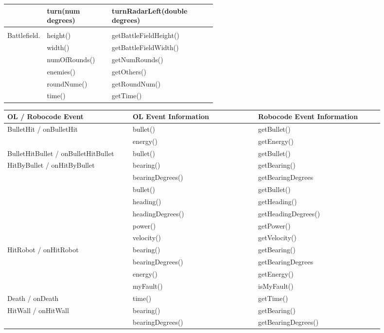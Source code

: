 \begin{center}
\begin{tabular}{ | l| l | p{0.5\linewidth} | }
     & turn(num degrees) & turnRadarLeft(double degrees) \\ \hline
     & &  \\ \hline
    Battlefield. & height() & getBattleFieldHeight() \\ \hline
     & width() & getBattleFieldWidth() \\ \hline
     & numOfRounds() & getNumRounds() \\ \hline
     & enemies() & getOthers() \\ \hline
     & roundNume() & getRoundNum() \\ \hline
     & time() & getTime()  \\
    \hline
    \end{tabular}
\end{center}

\begin{center}
	\begin{tabular}{ | p{0.3\linewidth} | p{0.3\linewidth} | p{0.3\linewidth} |}
		\hline
		OL / Robocode Event& OL Event Information & Robocode Event Information \\ \hline
		BulletHit / onBulletHit& bullet() & getBullet() \\ \hline
		& energy() & getEnergy() \\ \hline
		BulletHitBullet / onBulletHitBullet& bullet() & getBullet() \\ \hline
		HitByBullet / onHitByBullet& bearing() & getBearing() \\ \hline
		& bearingDegrees() & getBearingDegrees \\ \hline
		& bullet() & getBullet() \\ \hline
		& heading() & getHeading() \\ \hline
		& headingDegrees() & getHeadingDegrees() \\ \hline
		& power() & getPower() \\ \hline
		& velocity() & getVelocity() \\ \hline
		HitRobot / onHitRobot & bearing() & getBearing() \\ \hline
		& bearingDegrees() & getBearingDegrees \\ \hline
		& energy() & getEnergy() \\ \hline
		& myFault() & isMyFault() \\ \hline
		Death / onDeath & time() & getTime() \\ \hline
		HitWall / onHitWall & bearing() & getBearing() \\ \hline
		& bearingDegrees() & getBearingDegrees() \\ \hline

\end{tabular}
\end{center}
